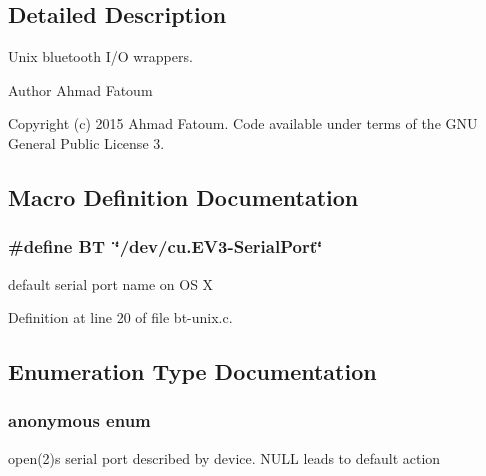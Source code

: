 \subsection{Detailed Description}
Unix bluetooth I/\+O wrappers. 

\begin{DoxyAuthor}{Author}
Ahmad Fatoum 
\end{DoxyAuthor}
\begin{DoxyCopyright}{Copyright}
(c) 2015 Ahmad Fatoum. Code available under terms of the G\+N\+U General Public License 3. 
\end{DoxyCopyright}


\subsection{Macro Definition Documentation}
\hypertarget{bt-unix_8c_a9ed5212b4acf61bb0f7b9b9078ba67ae}{}
\subsubsection[{B\+T}]{\setlength{\rightskip}{0pt plus 5cm}\#define B\+T~\char`\"{}/dev/cu.\+E\+V3-\/Serial\+Port\char`\"{}}\label{bt-unix_8c_a9ed5212b4acf61bb0f7b9b9078ba67ae}


default serial port name on O\+S X 



Definition at line 20 of file bt-\/unix.\+c.



\subsection{Enumeration Type Documentation}
\hypertarget{bt-unix_8c_a06fc87d81c62e9abb8790b6e5713c55b}{}\subsubsection[{anonymous enum}]{\setlength{\rightskip}{0pt plus 5cm}anonymous enum}\label{bt-unix_8c_a06fc87d81c62e9abb8790b6e5713c55b}


open(2)s serial port described by device. {\ttfamily N\+U\+L\+L} leads to default action 


